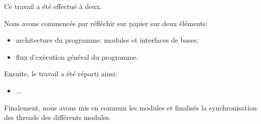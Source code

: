 \documentclass[11pt, a4paper]{article}
\begin{document}
Ce travail a été effectué à deux.

Nous avons commencés par réfléchir sur papier sur deux éléments:

\begin{itemize}
    \item architecture du programme: modules et interfaces de bases;
    \item flux d'exécution général du programme. \\
\end{itemize}

Ensuite, le travail a été réparti ainsi:
\begin{itemize}
    \item ... \\
\end{itemize}

Finalement, nous avons mis en commun les modules et finalisés la synchronisation des threads des différents modules.

\newpage
\end{document}
